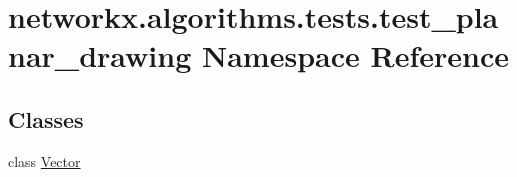 \hypertarget{namespacenetworkx_1_1algorithms_1_1tests_1_1test__planar__drawing}{}\section{networkx.\+algorithms.\+tests.\+test\+\_\+planar\+\_\+drawing Namespace Reference}
\label{namespacenetworkx_1_1algorithms_1_1tests_1_1test__planar__drawing}
\subsection*{Classes}
\begin{DoxyCompactItemize}
\item 
class \hyperlink{classnetworkx_1_1algorithms_1_1tests_1_1test__planar__drawing_1_1Vector}{Vector}
\end{DoxyCompactItemize}

